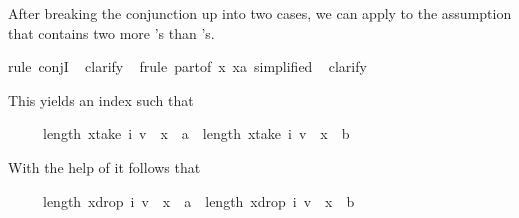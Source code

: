 \begin{isabellebody}
\begin{isamarkuptxt}
After breaking the conjunction up into two cases, we can apply
 to the assumption that  contains two more 's than 's.%
\end{isamarkuptxt}%
\isamarkuptrue%
\isamarkupfalse%
{}rule\ conjI{}\isanewline
\ \isamarkupfalse%
{}clarify{}\isanewline
\ \isamarkupfalse%
{}frule\ part{}{}of\ {}{}x{}\ x{}a{}{}\ simplified{}{}\isanewline
\ \isamarkupfalse%
{}clarify{}%
\begin{isamarkuptxt}%
\noindent
This yields an index  such that
\begin{isabelle}%
\ \ \ \ \ length\ {}x{}take\ i\ v\ {}\ x\ {}\ a{}\ {}\ length\ {}x{}take\ i\ v\ {}\ x\ {}\ b{}\ {}\ {}%
\end{isabelle}
With the help of  it follows that
\begin{isabelle}%
\ \ \ \ \ length\ {}x{}drop\ i\ v\ {}\ x\ {}\ a{}\ {}\ length\ {}x{}drop\ i\ v\ {}\ x\ {}\ b{}\ {}\ {}%
\end{isabelle}%

\end{isamarkuptxt}
\end{isabellebody}
